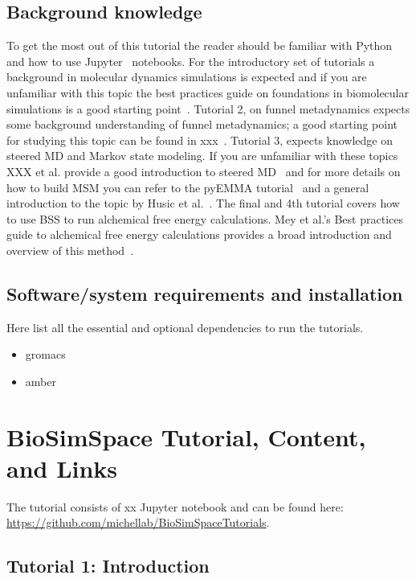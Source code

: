 \documentclass[9pt,tutorial]{livecoms}
\begin{document}
\subsection{Background knowledge}
To get the most out of this tutorial the reader should be familiar with Python and how to use Jupyter~\cite{} notebooks. For the introductory set of tutorials a background in molecular dynamics simulations is expected and if you are unfamiliar with this topic the best practices guide on foundations in biomolecular simulations is a good starting point~\cite{https://www.ncbi.nlm.nih.gov/pmc/articles/PMC6884151/}. Tutorial 2, on funnel metadynamics expects some background understanding of funnel metadynamics; a good starting point for studying this topic can be found in xxx~\cite{metadynamics citation}. Tutorial 3, expects knowledge on steered MD and Markov state modeling. If you are unfamiliar with these topics XXX et al. provide a good introduction to steered MD~\cite{sMD_steeredMD} and for more details on how to build MSM you can refer to the pyEMMA tutorial~\cite{https://livecomsjournal.org/index.php/livecoms/article/view/v1i1e5965/925} and a general introduction to the topic by Husic et al.~\cite{sMD_Husic-msm}.
The final and 4th tutorial covers how to use BSS to run alchemical free energy calculations. Mey et al.'s Best practices guide to alchemical free energy calculations provides a broad introduction and overview of this method~\cite{mey2020best}.

\subsection{Software/system requirements and installation}
Here list all the essential and optional dependencies to run the tutorials. 
\begin{itemize}
    \item gromacs
    \item amber
\end{itemize}

\section{BioSimSpace Tutorial, Content, and Links}

The tutorial consists of xx Jupyter notebook and can be found here: \url{https://github.com/michellab/BioSimSpaceTutorials}.

\subsection{Tutorial 1: Introduction}





\end{document}
